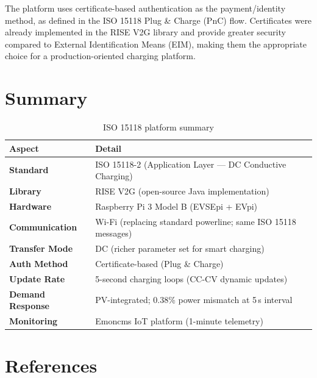 \documentclass[12pt,a4paper]{report}
\begin{document}
The platform uses certificate-based authentication as the payment/identity method, as defined
in the ISO 15118 Plug \& Charge (PnC) flow. Certificates were already implemented in the RISE
V2G library and provide greater security compared to External Identification Means (EIM),
making them the appropriate choice for a production-oriented charging platform.

\section{Summary}

\begin{table}[h!]
  \centering
  \caption{ISO 15118 platform summary}
  \label{tab:iso15118-summary}
  \renewcommand{\arraystretch}{1.3}
  \begin{tabular}{>{\bfseries}p{4cm} p{9cm}}
    \toprule
    Aspect          & Detail \\
    \midrule
    Standard        & ISO 15118-2 (Application Layer --- DC Conductive Charging) \\
    Library         & RISE V2G (open-source Java implementation) \\
    Hardware        & Raspberry Pi 3 Model B (EVSEpi + EVpi) \\
    Communication   & Wi-Fi (replacing standard powerline; same ISO 15118 messages) \\
    Transfer Mode   & DC (richer parameter set for smart charging) \\
    Auth Method     & Certificate-based (Plug \& Charge) \\
    Update Rate     & 5-second charging loops (CC-CV dynamic updates) \\
    Demand Response & PV-integrated; 0.38\% power mismatch at 5\,s interval \\
    Monitoring      & Emoncms IoT platform (1-minute telemetry) \\
    \bottomrule
  \end{tabular}
\end{table}

\section{References}
\end{document}
